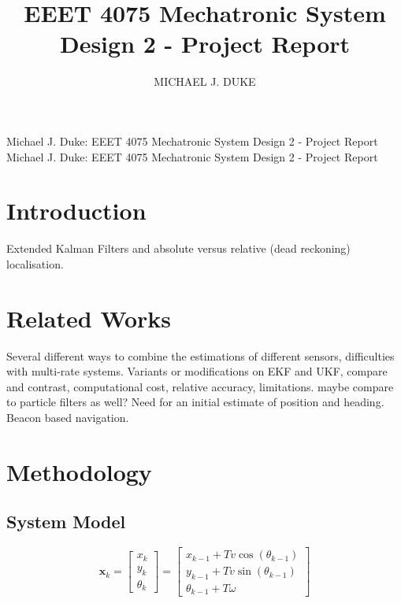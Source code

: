 \documentclass{ieeeaccess}
\begin{document}

\title{EEET 4075 Mechatronic System Design 2 - Project Report}
\author{\uppercase{Michael J. Duke}}
\address[1]{University of South Australia, Mawson Lakes, SA 5095 Australia (e-mail: dukmj002@mymail.unisa.edu.au)}

\markboth
{Michael J. Duke: EEET 4075 Mechatronic System Design 2 - Project Report}
{Michael J. Duke: EEET 4075 Mechatronic System Design 2 - Project Report}

\titlepgskip=-15pt

\maketitle

\section{Introduction}
\label{sec:introduction}
 Extended Kalman Filters and absolute versus relative (dead reckoning) localisation.

\section{Related Works}
\label{sec:rel}
Several different ways to combine the estimations of different sensors, difficulties with multi-rate systems. Variants or modifications on EKF and UKF, compare and contrast, computational cost, relative accuracy, limitations. maybe compare to particle filters as well? Need for an initial estimate of position and heading. Beacon based navigation.

\section{Methodology}
\label{sec:meth}
\subsection{System Model}
	\begin{equation}
	\label{eq:xsys}
		\boldsymbol{x}_{ k} = 
		\begin{bmatrix}
			x _{ k}	\\
			y_{ k}		\\
			\theta_{ k}
		\end{bmatrix}
		=
		\begin{bmatrix}
			x_{k-1}+Tv\cos{\left(\theta_{k-1}\right)}								\\
			y_{k-1}+Tv\sin{\left(\theta_{k-1}\right)}								\\
			\theta_{k-1} + T\omega
		\end{bmatrix}
	\end{equation}
	
\end{document}
